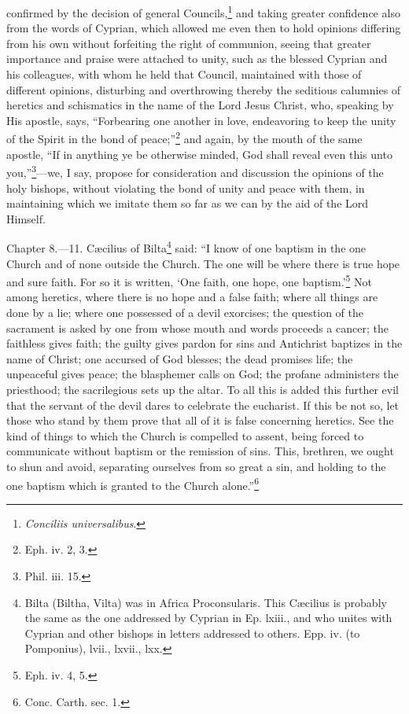 confirmed by the decision of general Councils,\footnote{\par  \emph{Conciliis universalibus}.} and taking greater confidence also from the words of Cyprian, which allowed me even then to hold opinions differing from his own without forfeiting the right of communion, seeing that greater importance and praise were attached to unity, such as the blessed Cyprian and his colleagues, with whom he held that Council, maintained with those of different opinions, disturbing and overthrowing thereby the seditious calumnies of heretics and schismatics in the name of the Lord Jesus Christ, who, speaking by His apostle, says, ``Forbearing one another in love, endeavoring to keep the unity of the Spirit in the bond of peace;''\footnote{\par  Eph. iv. 2, 3.} and again, by the mouth of the same apostle, ``If in anything ye be otherwise minded, God shall reveal even this unto you,''\footnote{\par  Phil. iii. 15.}—we, I say, propose for consideration and discussion the opinions of the holy bishops, without violating the bond of unity and peace with them, in maintaining which we imitate them so far as we can by the aid of the Lord Himself.


Chapter 8.—11. Cæcilius of Bilta\footnote{\par  Bilta (Biltha, Vilta) was in Africa Proconsularis. This Cæcilius is probably the same as the one addressed by Cyprian in Ep. lxiii., and who unites with Cyprian and other bishops in letters addressed to others. Epp. iv. (to Pomponius), lvii., lxvii., lxx.} said: ``I know of one baptism in the one Church and of none outside the Church. The one will be where there is true hope and sure faith. For so it is written, ‘One faith, one hope, one baptism.’\footnote{\par  Eph. iv. 4, 5.} Not among heretics, where there is no hope and a false faith; where all things are done by a lie; where one possessed of a devil exorcises; the question of the sacrament is asked by one from whose mouth and words proceeds a cancer; the faithless gives faith; the guilty gives pardon for sins and Antichrist baptizes in the name of Christ; one accursed of God blesses; the dead promises life; the unpeaceful gives peace; the blasphemer calls on God; the profane administers the priesthood; the sacrilegious sets up the altar. To all this is added this further evil that the servant of the devil dares to celebrate the eucharist. If this be not so, let those who stand by them prove that all of it is false concerning heretics. See the kind of things to which the Church is compelled to assent, being forced to communicate without baptism or the remission of sins. This, brethren, we ought to shun and avoid, separating ourselves from so great a sin, and holding to the one baptism which is granted to the Church alone.''\footnote{\par  Conc. Carth. sec. 1.}

